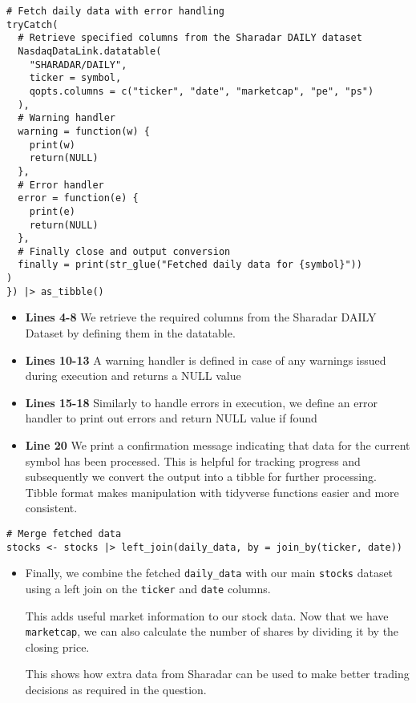 \documentclass[12pt,letterpaper]{article}
\begin{document}
\begin{verbatim}
# Fetch daily data with error handling
tryCatch(
  # Retrieve specified columns from the Sharadar DAILY dataset
  NasdaqDataLink.datatable(
    "SHARADAR/DAILY",        
    ticker = symbol,         
    qopts.columns = c("ticker", "date", "marketcap", "pe", "ps")  
  ),
  # Warning handler 
  warning = function(w) {
    print(w)
    return(NULL)
  },
  # Error handler 
  error = function(e) {
    print(e)
    return(NULL)
  },
  # Finally close and output conversion
  finally = print(str_glue("Fetched daily data for {symbol}"))
)
}) |> as_tibble() 
\end{verbatim}

\begin{itemize}
  \item \textbf{Lines 4-8} We retrieve the required columns from the Sharadar DAILY Dataset by defining them in the datatable.
  \item \textbf{Lines 10-13} A warning handler is defined in case of any warnings issued during execution and returns a NULL value
  \item \textbf{Lines 15-18} Similarly to handle errors in execution, we define an error handler to print out errors and return NULL value if found
  \item \textbf{Line 20} We print a confirmation message indicating that data for the current symbol has been processed. This is helpful for tracking progress and subsequently we convert the output into a tibble for further processing. Tibble format makes manipulation with tidyverse functions easier and more consistent.
\end{itemize}

\begin{verbatim}
# Merge fetched data
stocks <- stocks |> left_join(daily_data, by = join_by(ticker, date))
\end{verbatim}
\begin{itemize}
  \item Finally, we combine the fetched \texttt{daily\_data} with our main \texttt{stocks} dataset using a left join on the \texttt{ticker} and \texttt{date} columns.

        This adds useful market information to our stock data. Now that we have
        \texttt{marketcap}, we can also calculate the number of shares by dividing it
        by the closing price.

        This shows how extra data from Sharadar can be used to make better trading
        decisions as required in the question.
\end{itemize}
\end{document}
